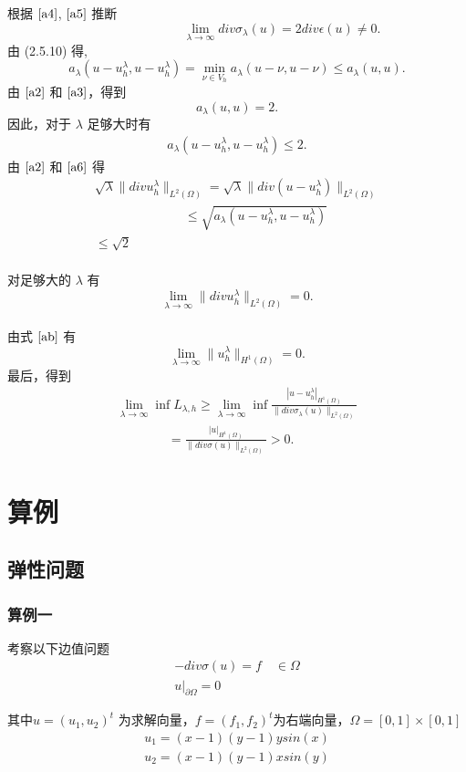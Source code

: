 \documentclass[a4paper,UTF8,titlepage]{ctexart}
\begin{document}
	根据 $\eqref{a4}$, $\eqref{a5}$ 推断
	$$
	\quad \quad \quad \quad \quad \quad \quad
	\lim\limits_{\lambda \to \infty} div \sigma_{\lambda}(u) = 2 div \epsilon(u) \ne 0. 
	$$
	由 (2.5.10) 得,
	$$
	a_{\lambda}(u-u_h^{\lambda}, u-u_h^{\lambda}) = \min\limits_{\nu \in V_h} a_{\lambda}(u-\nu,u-\nu) \le a_{\lambda}(u,u).
	$$
	由 $\eqref{a2}$ 和 $\eqref{a3}$，得到
	$$
	a_{\lambda}(u,u) = 2.
	$$
	因此，对于 $\lambda$ 足够大时有
	\begin{align} 
	a_{\lambda} (u-u_h^{\lambda}, u-u_h^{\lambda}) \le 2. \label{a6}
	\end{align}
	由 $\eqref{a2}$ 和 $\eqref{a6}$ 得
	\\
	$$
	\begin{matrix}
		\sqrt{\lambda} \| div u_h^{\lambda} \|_{L^2(\Omega)} = \sqrt{\lambda} \| div(u-u_h^{\lambda}) \|_{L^2(\Omega)} \\ 
		\quad \quad \quad \quad \quad \quad \quad
		\le \sqrt{a_{\lambda}(u-u_h^{\lambda}, u-u_h^{\lambda})} \\
		\le \sqrt{2}	
	\end{matrix}
	$$
	\\
	对足够大的 $\lambda$ 有
	$$
	\lim\limits_{\lambda \to \infty} \| div u_h^{\lambda} \|_{L^2(\Omega)} = 0.
	$$
	\\
	由式 $\eqref{ab}$ 有
	$$
	\lim\limits_{\lambda \to \infty} \| u_h^{\lambda} \|_{H^1(\Omega)} = 0.
	$$
	最后，得到 %
	$$ 
	\begin{matrix}
		\lim\limits_{\lambda \to \infty}\inf L_{\lambda,h} \ge \lim\limits_{\lambda \to \infty}\inf \frac{|u-u_h^{\lambda}|_{H^1(\Omega)}}{\| div \sigma_{\lambda}(u) \|_{L^2(\Omega)}} \\
		\quad \quad \quad \quad
		= \frac{|u|_{H^1(\Omega)}}{\| div \sigma(u) \|_{L^2(\Omega)}} > 0.
	\end{matrix}
	$$
	\fi

\section{算例}

\subsection{弹性问题}

\subsubsection{算例一}

考察以下边值问题
$$
\begin{matrix}
	-div \sigma(u) = f \quad \in \Omega  \\
	u |_{\partial \Omega} = 0
\end{matrix}
$$ 
\par
其中$ u = (u_1,u_2)^t $ 为求解向量，$ f = (f_1,f_2)^t $为右端向量，$ \Omega = [0,1] \times [0,1] $
$$
\begin{matrix}
	u_1 = (x - 1)(y - 1) y sin(x) 
	\\
	u_2 = (x - 1)(y - 1) x sin(y) 
\end{matrix}
$$
\end{document}
